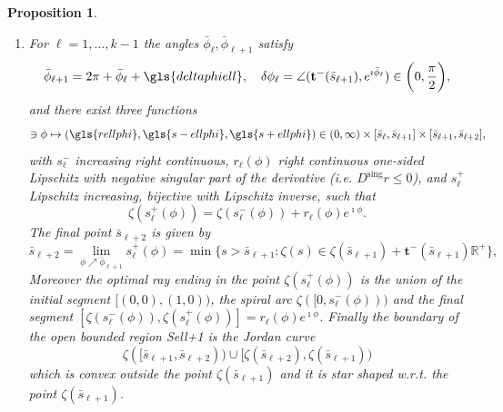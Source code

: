 \documentclass[reqno]{amsart}
\theoremstyle{definition} \newtheorem{definition}{Definition}[section]
\theoremstyle{definition} \newtheorem{remark}[definition]{Remark}
\theoremstyle{plain} \newtheorem{lemma}[definition]{Lemma}
\theoremstyle{plain} \newtheorem{proposition}[definition]{Proposition}
\theoremstyle{plain} \newtheorem{theorem}[definition]{Theorem}
\theoremstyle{plain} \newtheorem{corollary}[definition]{Corollary}
\theoremstyle{definition} \newtheorem{example}[definition]{Example}
\theoremstyle{plain} \newtheorem{claim}[clai]{Claim}
\theoremstyle{definition} \newtheorem{assumption}[definition]{Assumption}
\theoremstyle{definition} \newtheorem{observation}[definition]{Observation}
\newcommand{\R}{\mathbb{R}}
\newcommand{\sing}{\mathrm{sing}}
\newcommand{\1}{\mathbbm 1}
\renewcommand{\i}{\imath}
\numberwithin{equation}{section} %
\theoremstyle{plain} \newtheorem*{theorem*}{Theorem}
\theoremstyle{plain} \newtheorem{mthm}[maintheorem]{Main Theorem}
\theoremstyle{plain} \newtheorem*{mthm*}{Main Theorem}
\theoremstyle{plain} \newtheorem*{conjecture*}{Conjecture}
\theoremstyle{plain} \newtheorem{conjecture}[definition]{Conjecture}
\theoremstyle{plain} \newtheorem*{problem*}{Problem}
\begin{document}
\begin{proposition}
\begin{enumerate}
\item \label{Point_3:round_dec} For $\ell = 1,\dots,k-1$ the angles $\bar\phi_\ell,\bar\phi_{\ell+1}$ satisfy 
\begin{equation}
\label{Equa:next_angle_ell+2}
\bar \phi_{\ell+1} = 2\pi + \bar \phi_\ell + \gls{deltaphiell}, \quad \delta \phi_\ell = \angle (\mathbf t^-(\bar s_{\ell+1}), e^{\i \bar \phi_\ell}) %
\in \bigg( 0,\frac{\pi}{2} \bigg),
\end{equation}
and there exist three functions   
\begin{equation*}
[\bar \phi_{\ell},\bar \phi_{\ell+1}] \ni \phi \mapsto (\gls{rellphi},\gls{s-ellphi},\gls{s+ellphi}) \in (0,\infty) \times [\bar s_{\ell},\bar s_{\ell+1}] \times [\bar s_{\ell+1},\bar s_{\ell+2}],
\end{equation*}
with $s^-_\ell$ increasing right continuous, $r_\ell(\phi)$ right continuous one-sided Lipschitz with negative singular part of the derivative (i.e. $D^\sing r \leq 0$), and $s^+_\ell$ Lipschitz increasing, bijective with Lipschitz inverse, such that
\begin{equation*}
\zeta(s^+_\ell(\phi)) = \zeta(s^-_\ell(\phi)) + r_\ell(\phi) e^{\i \phi}.
\end{equation*}
The final point $\bar s_{\ell+2}$ is given by
\begin{equation}
\label{Equa:final_bar_s_ell+2}
\bar s_{\ell+2} = \lim_{\phi \nearrow \bar \phi_{\ell+1}} s^+_\ell(\phi) = \min \big\{ s > \bar s_{\ell+1}: \zeta(s) \in \zeta(\bar s_{\ell+1}) + \mathbf t^-(\bar s_{\ell+1}) \R^+  \big\},
\end{equation}
Moreover the optimal ray ending in the point $\zeta(s^+_\ell(\phi))$ is the union of the initial segment $[(0,0),(1,0))$, the spiral arc $\zeta([0,s^-_\ell(\phi)))$ and the final segment $[\zeta(s^-_\ell(\phi)),\zeta(s^+_\ell(\phi))] = r_\ell(\phi) e^{\i \phi}$. Finally the boundary of the open bounded region  \gls{Sell+1} is the Jordan curve %
\begin{equation*}
\zeta([\bar s_{\ell+1},\bar s_{\ell+2})) \cup [\zeta(\bar s_{\ell+2}),\zeta(\bar s_{\ell+1}))
\end{equation*}
which is convex outside the point $\zeta(\bar s_{\ell+1})$ and it is star shaped w.r.t. the point $\zeta(\bar s_{\ell+1})$.


\end{enumerate}
\end{proposition}
\end{document}
